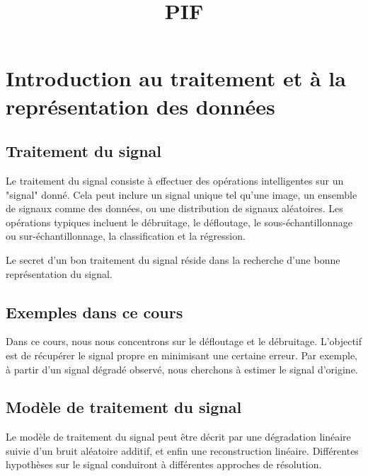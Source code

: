 \documentclass[12pt]{article}
\title{PIF}
\author{}
\date{}
\begin{document}
\maketitle
\tableofcontents
\newpage

\section{Introduction au traitement et à la représentation des données}

\subsection{Traitement du signal}

Le traitement du signal consiste à effectuer des opérations intelligentes sur un "signal" donné. Cela peut inclure un signal unique tel qu'une image, un ensemble de signaux comme des données, ou une distribution de signaux aléatoires. Les opérations typiques incluent le débruitage, le défloutage, le sous-échantillonnage ou sur-échantillonnage, la classification et la régression.

\begin{tcolorbox}[title={Intuition}]
Le secret d'un bon traitement du signal réside dans la recherche d'une bonne représentation du signal.
\end{tcolorbox}

\subsection{Exemples dans ce cours}

Dans ce cours, nous nous concentrons sur le défloutage et le débruitage. L'objectif est de récupérer le signal propre en minimisant une certaine erreur. Par exemple, à partir d'un signal dégradé observé, nous cherchons à estimer le signal d'origine.


\subsection{Modèle de traitement du signal}

Le modèle de traitement du signal peut être décrit par une dégradation linéaire suivie d'un bruit aléatoire additif, et enfin une reconstruction linéaire. Différentes hypothèses sur le signal conduiront à différentes approches de résolution.
\end{document}
